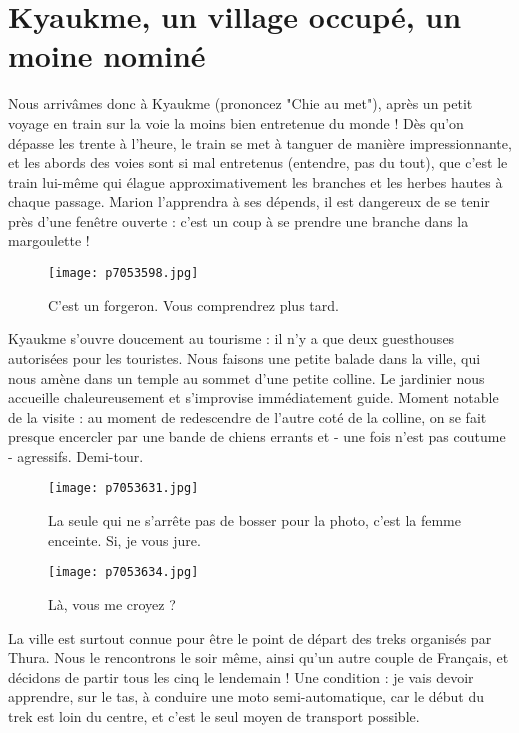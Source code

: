 \documentclass{book}
\begin{document}
\chapter{Kyaukme, un village occupé, un moine nominé}
Nous arrivâmes donc à Kyaukme (prononcez "Chie au met"), après un petit voyage en train sur la voie la moins bien entretenue du monde ! Dès qu'on dépasse les trente à l'heure, le train se met à tanguer de manière impressionnante, et les abords des voies sont si mal entretenus (entendre, pas du tout), que c'est le train lui-même qui élague approximativement les branches et les herbes hautes à chaque passage. Marion l'apprendra à ses dépends, il est dangereux de se tenir près d'une fenêtre ouverte : c'est un coup à se prendre une branche dans la margoulette !


\begin{figure}[h]
\centering
\texttt{[image: p7053598.jpg]}
\caption*{C'est un forgeron. Vous comprendrez plus tard.}
\end{figure}

Kyaukme s'ouvre doucement au tourisme : il n'y a que deux guesthouses autorisées pour les touristes. Nous faisons une petite balade dans la ville, qui nous amène dans un temple au sommet d'une petite colline. Le jardinier nous accueille chaleureusement et s'improvise immédiatement guide. Moment notable de la visite : au moment de redescendre de l'autre coté de la colline, on se fait presque encercler par une bande de chiens errants et - une fois n'est pas coutume - agressifs. Demi-tour.


\begin{figure}[h]
\centering
\texttt{[image: p7053631.jpg]}
\caption*{La seule qui ne s'arrête pas de bosser pour la photo, c'est la femme enceinte. Si, je vous jure.}
\end{figure}


\begin{figure}[h]
\centering
\texttt{[image: p7053634.jpg]}
\caption*{Là, vous me croyez ?}
\end{figure}

La ville est surtout connue pour être le point de départ des treks organisés par Thura. Nous le rencontrons le soir même, ainsi qu'un autre couple de Français, et décidons de partir tous les cinq le lendemain ! Une condition : je vais devoir apprendre, sur le tas, à conduire une moto semi-automatique, car le début du trek est loin du centre, et c'est le seul moyen de transport possible.
\end{document}
